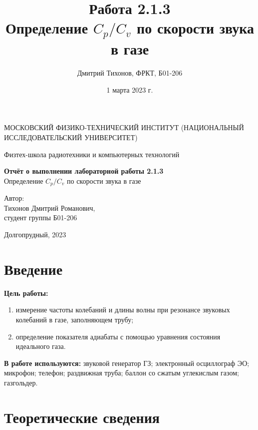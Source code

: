 \documentclass[a4paper, 12pt]{article}
\title{Работа 2.1.3 \\ Определение $C_p/C_v$ по скорости звука в газе}
\author{Дмитрий Тихонов, ФРКТ, Б01-206}
\date{1 марта 2023 г.}
\begin{document}
    \begin{titlepage}
	\begin{center}
            {\large МОСКОВСКИЙ ФИЗИКО-ТЕХНИЧЕСКИЙ ИНСТИТУТ (НАЦИОНАЛЬНЫЙ       ИССЛЕДОВАТЕЛЬСКИЙ УНИВЕРСИТЕТ)}
	\end{center}
 
	\begin{center}
		{\large Физтех-школа радиотехники и компьютерных технологий}
	\end{center}
	
	\vspace{8cm}
	{\LARGE
		\begin{center}
                {\bf Отчёт о выполнении лабораторной работы 2.1.3}\\
                Определение $C_p/C_v$ по скорости звука в газе
		\end{center}
	}
	\vspace{5cm}
	\begin{flushright}
		{\Large Автор:\\ Тихонов Дмитрий Романович, \\
			\vspace{0.2cm}
			студент группы Б01-206}
	\end{flushright}
	\vspace{5cm}
	\begin{center}
		\Large Долгопрудный, 2023
	\end{center}
    \end{titlepage}

    \section*{Введение}
        \noindent \textbf{Цель работы:}  
            \begin{enumerate}
                \item измерение частоты колебаний и длины волны при резонансе звуковых колебаний в газе, заполняющем трубу;
                \item определение показателя адиабаты с помощью уравнения состояния идеального газа.
            \end{enumerate}

        \noindent \textbf{В работе используются:} звуковой генератор ГЗ; электронный осциллограф ЭО; микрофон; телефон; раздвижная труба; баллон со сжатым углекислым газом; газгольдер.

    \section*{Теоретические сведения}
\end{document}
